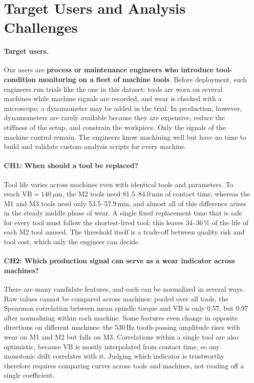 \section{Target Users and Analysis Challenges}
\label{sec:users}
\paragraph{Target users.}
Our users are \textbf{process or maintenance engineers who introduce tool-condition monitoring on a fleet
of machine tools}. Before deployment, such engineers run trials like the one in this dataset: tools are
worn on several machines while machine signals are recorded, and wear is checked with a microscope;
a dynamometer may be added in the trial. In production, however, dynamometers are rarely available
because they are expensive, reduce the stiffness of the setup, and constrain the workpiece.
Only the signals of the machine control remain. The engineers know machining well but have no time to
build and validate custom analysis scripts for every machine.

\paragraph{CH1: When should a tool be replaced?}
Tool life varies across machines even with identical tools and parameters.
To reach $\mathrm{VB}=140\,\mu$m, the M2 tools need 81.5--84.0\,min of contact time, whereas the M1 and M3
tools need only 53.5--57.9\,min, and almost all of this difference arises in the steady middle phase of
wear. A single fixed replacement time that is safe for every tool must follow the shortest-lived tool;
this leaves 34--36\,\% of the life of each M2 tool unused. The threshold itself is a trade-off between
quality risk and tool cost, which only the engineer can decide.

\paragraph{CH2: Which production signal can serve as a wear indicator across machines?}
There are many candidate features, and each can be normalized in several ways. Raw values cannot be
compared across machines: pooled over all tools, the Spearman correlation between mean spindle torque and
VB is only 0.57, but 0.97 after normalizing within each machine.
Some features even change in opposite directions on different machines: the 530\,Hz tooth-passing
amplitude rises with wear on M1 and M2 but falls on M3.
Correlations within a single tool are also optimistic, because VB is mostly interpolated from contact time,
so any monotonic drift correlates with it.
Judging which indicator is trustworthy therefore requires comparing curves across tools and machines,
not reading off a single coefficient.

